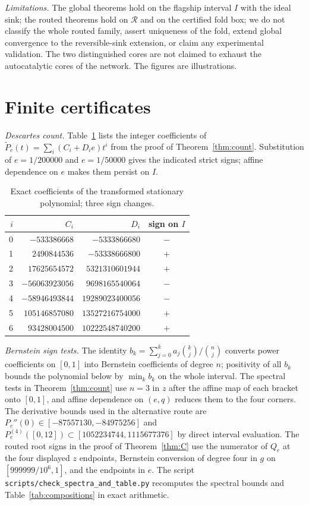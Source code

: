 \documentclass[11pt,a4paper]{article}
\theoremstyle{plain}
\theoremstyle{definition}
\theoremstyle{remark}
\newcommand{\Rr}{\mathcal{R}}
\begin{document}
\emph{Limitations.} The global theorems hold on the flagship interval $I$ with the ideal sink; the routed theorems hold on $\Rr$ and on the certified fold box; we do not classify the whole routed family, assert uniqueness of the fold, extend global convergence to the reversible-sink extension, or claim any experimental validation. The two distinguished cores are not claimed to exhaust the autocatalytic cores of the network. The figures are illustrations.

\appendix

\section{Finite certificates}\label{app:cert}

\emph{Descartes count.} Table~\ref{tab:descartes} lists the integer coefficients of $\widetilde P_e(t)=\sum_i(C_i+D_ie)t^i$ from the proof of Theorem~\ref{thm:count}. Substitution of $e=1/200000$ and $e=1/50000$ gives the indicated strict signs; affine dependence on $e$ makes them persist on $I$.

\begin{table}[htb]\centering\small
\begin{tabular}{@{}rrrc@{}}\toprule
$i$ & $C_i$ & $D_i$ & sign on $I$\\\midrule
0 & $-533386668$ & $-5333866680$ & $-$\\
1 & $2490844536$ & $-53338666800$ & $+$\\
2 & $17625654572$ & $5321310601944$ & $+$\\
3 & $-56063923056$ & $9698165540064$ & $-$\\
4 & $-58946493844$ & $19289023400056$ & $-$\\
5 & $105146857080$ & $13527216754000$ & $+$\\
6 & $93428004500$ & $10222548740200$ & $+$\\\bottomrule
\end{tabular}
\caption{Exact coefficients of the transformed stationary polynomial; three sign changes.}\label{tab:descartes}
\end{table}

\emph{Bernstein sign tests.} The identity $b_k=\sum_{j=0}^ka_j\binom kj/\binom nj$ converts power coefficients on $[0,1]$ into Bernstein coefficients of degree $n$; positivity of all $b_k$ bounds the polynomial below by $\min_kb_k$ on the whole interval. The spectral tests in Theorem~\ref{thm:count} use $n=3$ in $z$ after the affine map of each bracket onto $[0,1]$, and affine dependence on $(e,q)$ reduces them to the four corners. The derivative bounds used in the alternative route are $P_e''(0)\in[-87557130,-84975256]$ and $P_e^{(4)}([0,12])\subset[1052234744,1115677376]$ by direct interval evaluation. The routed root signs in the proof of Theorem~\ref{thm:C} use the numerator of $Q_e$ at the four displayed $z$ endpoints, Bernstein conversion of degree four in $g$ on $[999999/10^6,1]$, and the endpoints in $e$. The script \texttt{scripts/check\_spectra\_and\_table.py} recomputes the spectral bounds and Table~\ref{tab:compositions} in exact arithmetic.
\end{document}
